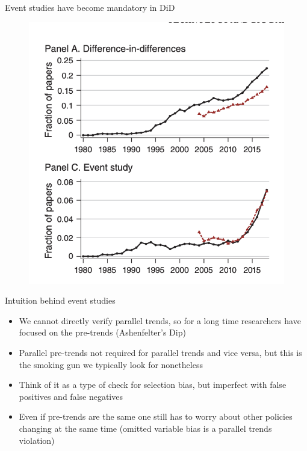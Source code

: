 \documentclass{beamer}
\begin{document}
\begin{frame}{Event studies have become mandatory in DiD}

	\begin{figure}
	\includegraphics[scale=0.5]{./lecture_includes/currie_eventstudy.png}
	\end{figure}

\end{frame}

\begin{frame}{Intuition behind event studies}

\begin{itemize}

	\item We cannot directly verify parallel trends, so for a long time researchers have focused on the pre-trends (Ashenfelter's Dip)
	\item Parallel pre-trends not required for parallel trends and vice versa, but this is the smoking gun we typically look for nonetheless
	\item Think of it as a type of check for selection bias, but imperfect with false positives and false negatives
	\item Even if pre-trends are the same one still has to worry about other policies changing at the same time (omitted variable bias is a parallel trends violation)

\end{itemize}

\end{frame}
\end{document}
